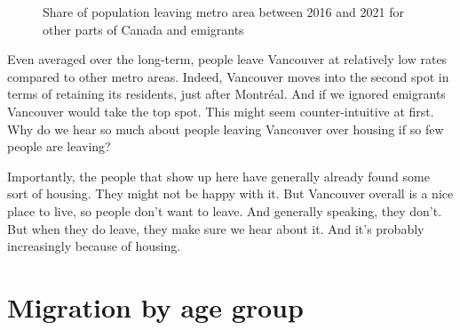 \documentclass[
  letterpaper,
]{article}
\begin{document}
\begin{figure}[H]


\caption{\label{fig-metro-leaving-rates}Share of population leaving
metro area between 2016 and 2021 for other parts of Canada and
emigrants}

\end{figure}%

Even averaged over the long-term, people leave Vancouver at relatively
low rates compared to other metro areas. Indeed, Vancouver moves into
the second spot in terms of retaining its residents, just after
Montréal. And if we ignored emigrants Vancouver would take the top spot.
This might seem counter-intuitive at first. Why do we hear so much about
people leaving Vancouver over housing if so few people are leaving?

Importantly, the people that show up here have generally already found
some sort of housing. They might not be happy with it. But Vancouver
overall is a nice place to live, so people don't want to leave. And
generally speaking, they don't. But when they do leave, they make sure
we hear about it. And it's probably increasingly because of housing.

\section{Migration by age group}\label{migration-by-age-group}
\end{document}
